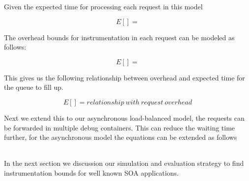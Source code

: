 Given the expected time for processing each request in this model

\begin{equation}
E[] =
\end{equation}

The overhead bounds for instrumentation in each request can be modeled as follows:

\begin{equation}
E[] = 
\end{equation}

This gives us the following relationship between overhead and expected time for the queue to fill up.

\begin{equation}
E[] = relationship\ with\ request\ overhead
\end{equation}


Next we extend this to our asynchronous load-balanced model, the requests can be forwarded in multiple debug containers.
This can reduce the waiting time further, for the asynchronous model the equations can be extended as follows\\ \\
\fi

In the next section we discussion our simulation and evaluation strategy to find instrumentation bounds for well known SOA applications.
